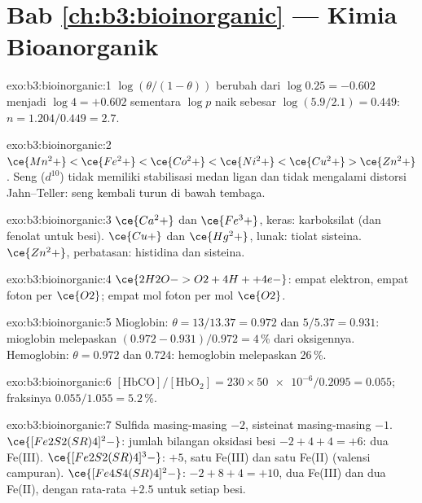 \section*{Bab \ref{ch:b3:bioinorganic} --- Kimia Bioanorganik}

\begin{solution}{exo:b3:bioinorganic:1}
$\log(\theta/(1 - \theta))$ berubah dari $\log 0.25 = -0.602$ menjadi $\log 4 = +0.602$ sementara $\log p$ naik sebesar
$\log(5.9/2.1) = 0.449$: $n = 1.204/0.449 = 2.7$.
\end{solution}

\begin{solution}{exo:b3:bioinorganic:2}
$\ce{Mn^2+} < \ce{Fe^2+} < \ce{Co^2+} < \ce{Ni^2+} < \ce{Cu^2+} > \ce{Zn^2+}$. Seng ($d^{10}$) tidak memiliki stabilisasi medan ligan dan tidak mengalami
distorsi Jahn--Teller: seng kembali turun di bawah tembaga.
\end{solution}

\begin{solution}{exo:b3:bioinorganic:3}
$\ce{Ca^2+}$ dan $\ce{Fe^3+}$, keras: karboksilat (dan fenolat untuk besi). $\ce{Cu+}$ dan $\ce{Hg^2+}$, lunak:
tiolat sisteina. $\ce{Zn^2+}$, perbatasan: histidina dan sisteina.
\end{solution}

\begin{solution}{exo:b3:bioinorganic:4}
$\ce{2H2O -> O2 + 4H+ + 4e-}$: empat elektron, empat foton per $\ce{O2}$; empat mol foton per
mol $\ce{O2}$.
\end{solution}

\begin{solution}{exo:b3:bioinorganic:5}
Mioglobin: $\theta = 13/13.37 = 0.972$ dan $5/5.37 = 0.931$: mioglobin melepaskan $(0.972 - 0.931)/0.972 = 4$\,\% dari
oksigennya. Hemoglobin: $\theta = 0.972$ dan $0.724$: hemoglobin melepaskan 26\,\%.
\end{solution}

\begin{solution}{exo:b3:bioinorganic:6}
$[\mathrm{HbCO}]/[\mathrm{HbO_2}] = 230 \times \num{50e-6}/0.2095 = 0.055$; fraksinya $0.055/1.055 = 5.2$\,\%.
\end{solution}

\begin{solution}{exo:b3:bioinorganic:7}
Sulfida masing-masing $-2$, sisteinat masing-masing $-1$. $\ce{[Fe2S2(SR)4]^2-}$: jumlah bilangan oksidasi besi $-2 + 4 + 4 = +6$: dua
Fe(III). $\ce{[Fe2S2(SR)4]^3-}$: $+5$, satu Fe(III) dan satu Fe(II) (valensi campuran). $\ce{[Fe4S4(SR)4]^2-}$:
$-2 + 8 + 4 = +10$, dua Fe(III) dan dua Fe(II), dengan rata-rata $+2.5$ untuk setiap besi.
\end{solution}

